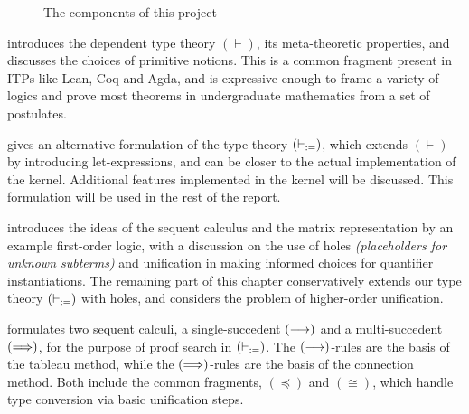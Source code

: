 \documentclass[twoside]{report}
\begin{document}
\begin{figure}[ht]
    \centering
\caption{The components of this project}
\label{fig:introduction_components_of_zenith}
\end{figure}

 introduces the dependent type theory $(\vdash)$, its meta-theoretic properties, and discusses the choices of primitive notions. This is a common fragment present in ITPs like Lean, Coq and Agda, and is expressive enough to frame a variety of logics and prove most theorems in undergraduate mathematics from a set of postulates.

 gives an alternative formulation of the type theory $(\vdash_{:=})$, which extends $(\vdash)$ by introducing let-expressions, and can be closer to the actual implementation of the kernel. Additional features implemented in the kernel will be discussed. This formulation will be used in the rest of the report.

 introduces the ideas of the sequent calculus and the matrix representation by an example first-order logic, with a discussion on the use of holes \emph{(placeholders for unknown subterms)} and unification in making informed choices for quantifier instantiations. The remaining part of this chapter conservatively extends our type theory $(\vdash_{:=})$ with holes, and considers the problem of higher-order unification.

 formulates two sequent calculi, a single-succedent $(\longrightarrow)$ and a multi-succedent $(\Longrightarrow)$, for the purpose of proof search in $(\vdash_{:=})$. The $(\longrightarrow)$-rules are the basis of the tableau method, while the $(\Longrightarrow)$-rules are the basis of the connection method. Both include the common fragments, $(\preceq)$ and $(\cong)$, which handle type conversion via basic unification steps.
\end{document}
